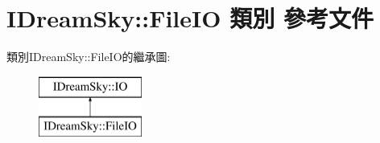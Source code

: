 \hypertarget{class_i_dream_sky_1_1_file_i_o}{}\section{I\+Dream\+Sky\+:\+:File\+IO 類別 參考文件}
\label{class_i_dream_sky_1_1_file_i_o}
類別\+I\+Dream\+Sky\+:\+:File\+I\+O的繼承圖\+:\begin{figure}[H]
\begin{center}
\leavevmode
\includegraphics[height=2.000000cm]{class_i_dream_sky_1_1_file_i_o}
\end{center}
\end{figure}
